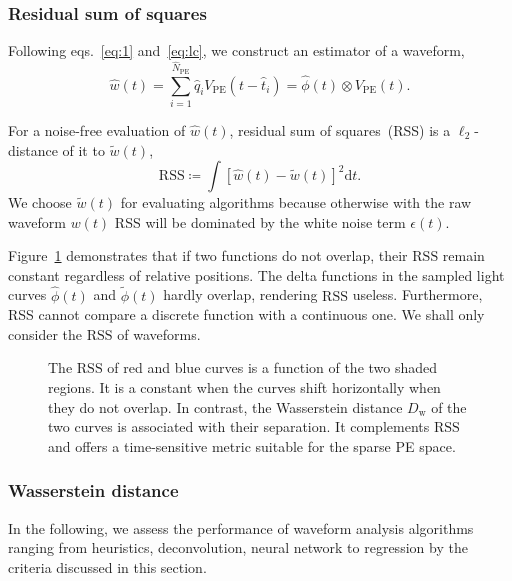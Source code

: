 \subsubsection{Residual sum of squares}
\label{sec:rss}

Following eqs.~\eqref{eq:1} and~\eqref{eq:lc}, we construct an estimator of a waveform,
\begin{equation}
  \label{eq:w-hat}
  \hat{w}(t) = \sum_{i=1}^{\hat{N}_\mathrm{PE}}\hat{q}_i V_\mathrm{PE}(t-\hat{t}_i) = \hat{\phi}(t) \otimes V_\mathrm{PE}(t).
\end{equation}

For a noise-free evaluation of $\hat{w}(t)$, residual sum of squares~(RSS) is a $\ell_2$-distance of it to $\tilde{w}(t)$,
\begin{equation}
  \label{eq:rss}
  \mathrm{RSS} \coloneqq\int\left[\hat{w}(t) - \tilde{w}(t)\right]^2\mathrm{d}t.
\end{equation}
We choose $\tilde{w}(t)$ for evaluating algorithms because otherwise with the raw waveform $w(t)$ RSS will be dominated by the white noise term $\epsilon(t)$.

Figure~\ref{fig:l2} demonstrates that if two functions do not overlap, their $\mathrm{RSS}$ remain constant regardless of relative positions.  The delta functions in the sampled light curves $\hat{\phi}(t)$ and $\tilde{\phi}(t)$ hardly overlap, rendering $\mathrm{RSS}$ useless.  Furthermore, RSS cannot compare a discrete function with a continuous one.  We shall only consider the $\mathrm{RSS}$ of waveforms.

\begin{figure}[H]
  \centering
  \resizebox{0.6\textwidth}{!}{}
  \caption{\label{fig:l2} The $\mathrm{RSS}$ of red and blue curves is a function of the two shaded regions. It is a constant when the curves shift horizontally when they do not overlap.  In contrast, the Wasserstein distance $D_\mathrm{w}$ of the two curves is associated with their separation.  It complements $\mathrm{RSS}$ and offers a time-sensitive metric suitable for the sparse PE space.}
\end{figure}

\subsubsection{Wasserstein distance}
\label{sec:W-dist}



In the following, we assess the performance of waveform analysis algorithms ranging from heuristics, deconvolution, neural network to regression by the criteria discussed in this section.

